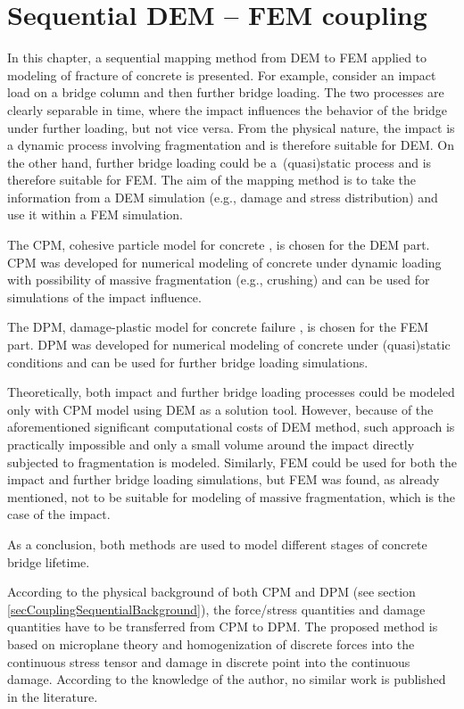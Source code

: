 \chapter{Sequential DEM -- FEM coupling}\label{chapCouplingSequential}
In this chapter, a sequential mapping method from DEM to FEM applied to modeling of fracture of concrete is presented.
For example, consider
an impact load on a bridge column
and then
further bridge loading.
The two processes are clearly separable in time, where
the impact
influences
the behavior of the bridge under further loading,
but not vice versa.
From the physical nature,
the impact
is a dynamic process involving fragmentation and is therefore suitable for DEM.
On the other hand,
further bridge loading
could be a~(quasi)static  process and is therefore suitable for FEM.
The aim of the mapping method is to take the information from a DEM simulation (e.g., damage and stress distribution) and use it within a FEM simulation.

The CPM, cohesive particle model for concrete \cite{Smilauer2010a}, is chosen for the DEM part.
CPM was developed for numerical modeling of concrete under dynamic loading with possibility of massive fragmentation (e.g., crushing) and can be used for simulations of
the impact influence.

The DPM, damage-plastic model for concrete failure \cite{GrasslJirasek2006a}, is chosen for the FEM part.
DPM was developed for numerical modeling of concrete under (quasi)static conditions and can be used for
further bridge loading
simulations.

Theoretically, both
impact
and
further bridge loading
processes could be modeled only with CPM model using DEM as a solution tool.
However, because of the aforementioned significant computational costs of DEM method, such approach is practically impossible and only a small volume around
the impact
directly subjected to fragmentation is modeled.
Similarly, FEM could be used for both
the impact
and
further bridge loading
simulations, but FEM was found, as already mentioned, not to be suitable for modeling of massive fragmentation, which is the case of
the impact.

As a conclusion, both methods are used to model different stages of concrete
bridge
lifetime.

According to the physical background of both CPM and DPM (see section \ref{secCouplingSequentialBackground}), the force/stress quantities and damage quantities have to be transferred from CPM to DPM.
The proposed method is based on microplane theory and homogenization of discrete forces into the continuous stress tensor and damage in discrete point into the continuous damage.
According to the knowledge of the author, no similar work is published in the literature.

